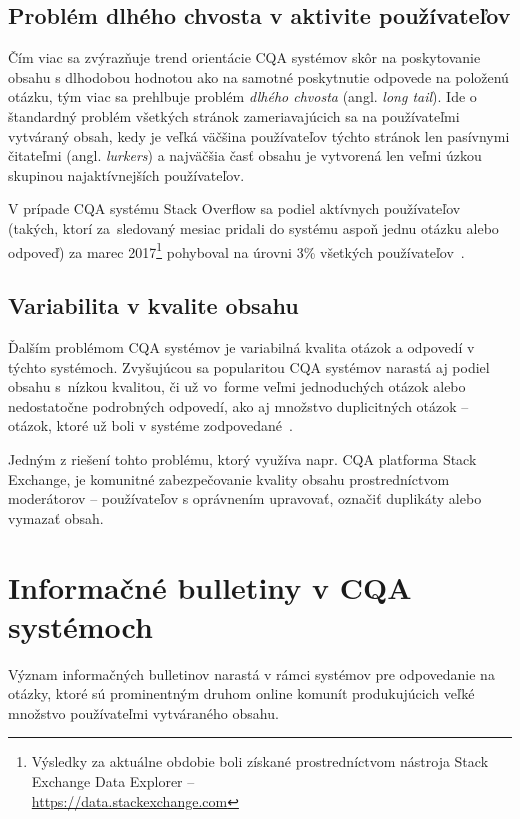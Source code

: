 \subsection{Problém dlhého chvosta v aktivite používateľov}\label{cqa:tail}
Čím viac sa zvýrazňuje trend orientácie CQA systémov skôr na poskytovanie obsahu s dlhodobou hodnotou ako na samotné
poskytnutie odpovede na položenú otázku, tým viac sa prehlbuje problém \emph{dlhého chvosta} (angl. \emph{long tail}).
Ide o štandardný problém všetkých stránok zameriavajúcich sa na používateľmi vytváraný obsah, kedy je veľká väčšina
používateľov týchto stránok len pasívnymi čitateľmi (angl. \emph{lurkers}) a najväčšia časť obsahu je vytvorená len veľmi
úzkou skupinou najaktívnejších používateľov.

V prípade CQA systému Stack Overflow sa podiel aktívnych používateľov (takých, ktorí za~sledovaný mesiac pridali
do systému aspoň jednu otázku alebo odpoveď) za marec 2017\footnote{Výsledky za aktuálne obdobie boli získané prostredníctvom nástroja Stack
Exchange Data Explorer -- \\\url{https://data.stackexchange.com}} pohyboval na úrovni 3\% všetkých
používateľov~\cite{Srba2016SOFail}.

\subsection{Variabilita v kvalite obsahu}
Ďalším problémom CQA systémov je variabilná kvalita otázok a odpovedí v týchto systémoch. Zvyšujúcou sa popularitou CQA
systémov narastá aj podiel obsahu s~nízkou kvalitou, či už vo~forme veľmi jednoduchých otázok alebo nedostatočne
podrobných odpovedí, ako aj množstvo duplicitných otázok -- otázok, ktoré už boli v systéme
zodpovedané~\cite{Srba2016SOFail,Ponzanelli2014}.

Jedným z riešení tohto problému, ktorý využíva napr. CQA platforma Stack Exchange, je komunitné zabezpečovanie kvality obsahu
prostredníctvom moderátorov -- používateľov s oprávnením upravovať, označiť duplikáty alebo vymazať obsah.


\section{Informačné bulletiny v CQA systémoch}

Význam informačných bulletinov narastá v rámci systémov pre odpovedanie na otázky, ktoré sú prominentným druhom
online komunít produkujúcich veľké množstvo používateľmi vytváraného obsahu.

